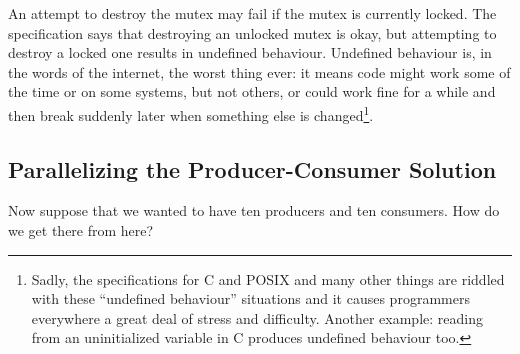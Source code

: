 \documentclass[a4paper]{report}
\begin{document}
An attempt to destroy the mutex may fail if the mutex is currently locked. The specification says that destroying an unlocked mutex is okay, but attempting to destroy a locked one results in undefined behaviour. Undefined behaviour is, in the words of the internet, the worst thing ever: it means code might work some of the time or on some systems, but not others, or could work fine for a while and then break suddenly later when something else is changed\footnote{Sadly, the specifications for C and POSIX and many other things are riddled with these ``undefined behaviour'' situations and it causes programmers everywhere a great deal of stress and difficulty. Another example: reading from an uninitialized variable in C produces undefined behaviour too.}.

\subsection*{Parallelizing the Producer-Consumer Solution}
Now suppose that we wanted to have ten producers and ten consumers. How do we get there from here?
\end{document}
